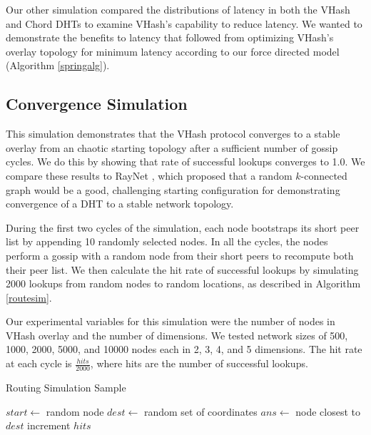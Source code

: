 \documentclass[10pt, conference, letterpaper]{IEEEtran}
\begin{document}
Our other simulation compared the distributions of latency in both the VHash and Chord DHTs to examine VHash's capability to reduce latency. 
We wanted to demonstrate the benefits to latency that followed from optimizing VHash's overlay topology for minimum latency according to our force directed model (Algorithm \ref{springalg}).

\subsection{Convergence Simulation}
This simulation demonstrates that the VHash protocol converges to a stable overlay from an chaotic starting topology after a sufficient number of gossip cycles.  
We do this by showing that rate of successful lookups converges to 1.0.
We compare these results to RayNet \cite{raynet}, which proposed that a random $k$-connected graph would be a good, challenging starting configuration for demonstrating convergence of a DHT to a stable network topology.

During the first two cycles of the simulation, each node bootstraps its short peer list by appending 10 randomly selected nodes.
In all the cycles, the nodes perform a gossip with a random node from their short peers to recompute both their peer list.
We then calculate the hit rate of successful lookups by simulating 2000 lookups from random nodes to random locations, as described in Algorithm \ref{routesim}.

Our experimental variables for this simulation were the number of nodes in VHash overlay and the number of dimensions.  
We tested network sizes of 500, 1000, 2000, 5000, and 10000 nodes each in 2, 3, 4, and 5 dimensions.
The hit rate at each cycle is $\frac{hits}{2000}$, where hits are the number of successful lookups.

 


\begin{algorithm}
\caption{Routing Simulation Sample}
\label{routesim}
\begin{algorithmic}[1]  %
	\STATE $start \leftarrow$ random node
	\STATE $dest \leftarrow$ random set of coordinates
    \STATE $ans \leftarrow$ node closest to $dest$
    	\STATE increment $hits$
    \ENDIF
\end{algorithmic} 
\end{algorithm}


\end{document}
